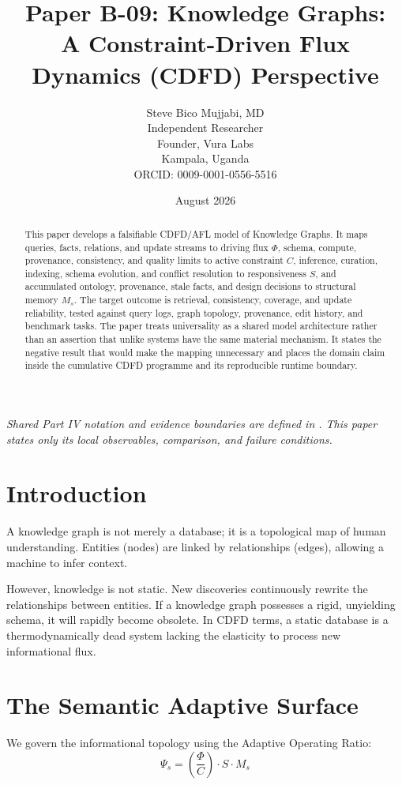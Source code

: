 \documentclass[11pt,a4paper]{article}
\title{\textbf{Paper B-09: Knowledge Graphs:\\ A Constraint-Driven Flux Dynamics (CDFD) Perspective}}
\author{Steve Bico Mujjabi, MD\\
\small Independent Researcher\\
\small Founder, Vura Labs\\
\small Kampala, Uganda\\
\small ORCID: 0009-0001-0556-5516}
\date{August 2026}
\begin{document}
\maketitle

\noindent\textit{Shared Part IV notation and evidence boundaries are defined in . This paper states only its local observables, comparison, and failure conditions.}


\begin{abstract}
This paper develops a falsifiable CDFD/AFL model of Knowledge Graphs. It maps queries, facts, relations, and update streams to driving flux $\Phi$, schema, compute, provenance, consistency, and quality limits to active constraint $C$, inference, curation, indexing, schema evolution, and conflict resolution to responsiveness $S$, and accumulated ontology, provenance, stale facts, and design decisions to structural memory $M_s$. The target outcome is retrieval, consistency, coverage, and update reliability, tested against query logs, graph topology, provenance, edit history, and benchmark tasks. The paper treats universality as a shared model architecture rather than an assertion that unlike systems have the same material mechanism. It states the negative result that would make the mapping unnecessary and places the domain claim inside the cumulative CDFD programme and its reproducible runtime boundary.
\end{abstract}

\section{Introduction}

A knowledge graph is not merely a database; it is a topological map of human understanding. Entities (nodes) are linked by relationships (edges), allowing a machine to infer context.

However, knowledge is not static. New discoveries continuously rewrite the relationships between entities. If a knowledge graph possesses a rigid, unyielding schema, it will rapidly become obsolete. In CDFD terms, a static database is a thermodynamically dead system lacking the elasticity to process new informational flux.

\section{The Semantic Adaptive Surface}
We govern the informational topology using the Adaptive Operating Ratio:
\begin{equation}
    \Psi_s = \left( \frac{\Phi}{C} \right) \cdot S \cdot M_s
\end{equation}
\end{document}
